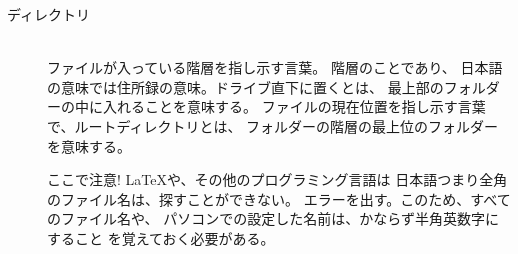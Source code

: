 \documentclass{ltjsarticle}
\begin{document}
\begin{description}
  \item [ディレクトリ] ~\\
    ファイルが入っている階層を指し示す言葉。
    階層のことであり、
    日本語の意味では住所録の意味。ドライブ直下に置くとは、
    最上部のフォルダーの中に入れることを意味する。
    ファイルの現在位置を指し示す言葉で、ルートディレクトリとは、
    フォルダーの階層の最上位のフォルダーを意味する。


    ここで注意! \LaTeX や、その他のプログラミング言語は
    日本語つまり全角のファイル名は、探すことができない。
    エラーを出す。このため、すべてのファイル名や、
    パソコンでの設定した名前は、かならず半角英数字にすること
    を覚えておく必要がある。


\end{description}
\end{document}
